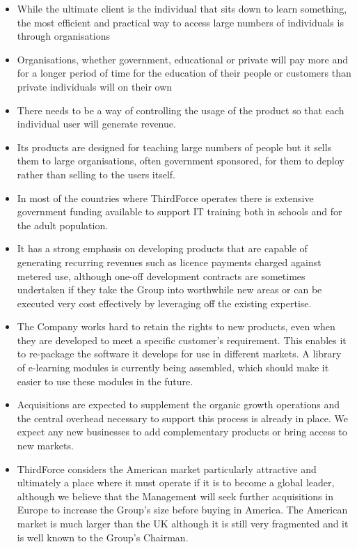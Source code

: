 \documentclass[a4paper,12pt]{article}
\begin{document}
\begin{itemize}

\item While the ultimate client is the individual that sits down to
learn something, the most efficient and practical way to access large
numbers of individuals is through organisations

\item Organisations, whether government, educational or private will pay
more and for a longer period of time for the education of their people
or customers than private individuals will on their own

\item There needs to be a way of controlling the usage of the product so
that each individual user will generate revenue.	

\item Its products are designed for teaching large numbers of people but
it sells them to large organisations, often government sponsored, for
them to deploy rather than selling to the users itself.	

\item In most of the countries where ThirdForce operates there is
extensive government funding available to support IT training both in
schools and for the adult population.

\item It has a strong emphasis on developing products that are capable
of generating recurring revenues such as licence payments charged
against metered use, although one-off development contracts are
sometimes undertaken if they take the Group into worthwhile new areas or
can be executed very cost effectively by leveraging off the existing
expertise.

\item The Company works hard to retain the rights to new products, even
when they are developed to meet a specific customer's requirement.
This enables it to re-package the software it develops for use in
different markets. A library of e-learning modules is currently being
assembled, which should make it easier to use these modules in the
future.	
\item	Acquisitions are expected to supplement the organic growth
operations and the central overhead necessary to support this process is
already in place. We expect any new businesses to add complementary
products or bring access to new markets.
\item ThirdForce considers the American market particularly attractive
and ultimately a place where it must operate if it is to become a global
leader, although we believe that the Management will seek further
acquisitions in Europe to increase the Group's size before buying in
America. The American market is much larger than the UK although it is
still very fragmented and it is well known to the Group's Chairman.

\end{itemize}
\end{document}
